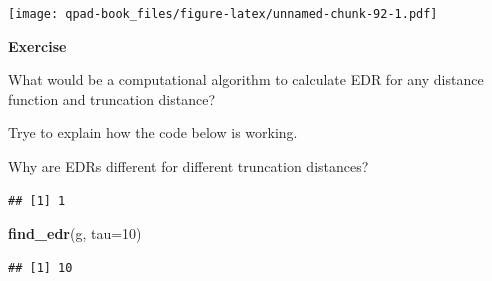 \documentclass[12pt,]{book}
\newenvironment{Shaded}{\begin{snugshade}}{\end{snugshade}}
\newcommand{\CommentTok}[1]{\textcolor[rgb]{0.56,0.35,0.01}{\textit{#1}}}
\newcommand{\ControlFlowTok}[1]{\textcolor[rgb]{0.13,0.29,0.53}{\textbf{#1}}}
\newcommand{\DataTypeTok}[1]{\textcolor[rgb]{0.13,0.29,0.53}{#1}}
\newcommand{\DecValTok}[1]{\textcolor[rgb]{0.00,0.00,0.81}{#1}}
\newcommand{\KeywordTok}[1]{\textcolor[rgb]{0.13,0.29,0.53}{\textbf{#1}}}
\newcommand{\NormalTok}[1]{#1}
\newcommand{\OperatorTok}[1]{\textcolor[rgb]{0.81,0.36,0.00}{\textbf{#1}}}
\newcommand{\OtherTok}[1]{\textcolor[rgb]{0.56,0.35,0.01}{#1}}
\newcommand{\StringTok}[1]{\textcolor[rgb]{0.31,0.60,0.02}{#1}}
\let\BeginKnitrBlock\begin \let\EndKnitrBlock\end
\begin{document}
\texttt{[image: qpad-book\_files/figure-latex/unnamed-chunk-92-1.pdf]}

\BeginKnitrBlock{rmdexercise}
\textbf{Exercise}

What would be a computational algorithm to calculate EDR
for any distance function and truncation distance?

Trye to explain how the code below is working.

Why are EDRs different for different truncation distances?
\EndKnitrBlock{rmdexercise}

\begin{Shaded}
\end{Shaded}

\begin{verbatim}
## [1] 1
\end{verbatim}

\begin{Shaded}
\begin{Highlighting}[]
\KeywordTok{find_edr}\NormalTok{(g, }\DataTypeTok{tau=}\DecValTok{10}\NormalTok{)}
\end{Highlighting}
\end{Shaded}

\begin{verbatim}
## [1] 10
\end{verbatim}
\end{document}
